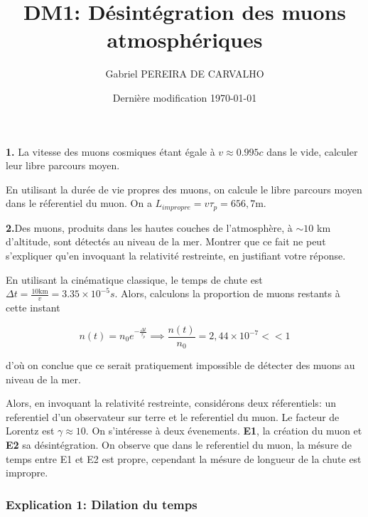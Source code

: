 \documentclass[french]{article}
\begin{document}
	\title{DM1: Désintégration des muons atmosphériques}
	\author{Gabriel PEREIRA DE CARVALHO}
	\date{Dernière modification \today}
	
	\maketitle
	
	\begin{tcolorbox}[colback=gray!5!white,colframe=gray!75!black]
		\textbf{1.} La vitesse des muons cosmiques étant égale à $v \approx 0.995c$ dans le vide, calculer leur libre parcours moyen. 
	\end{tcolorbox}

	En utilisant la durée de vie propres des muons, on calcule le libre parcours moyen dans le réferentiel du muon. On a $L_{impropre} = v \tau_p = 656,7 \mathrm{m}$.

	\begin{tcolorbox}[colback=gray!5!white,colframe=gray!75!black]
		\textbf{2.}Des muons, produits dans les hautes couches de l'atmosphère, à $\sim 10$ km d'altitude, sont détectés au niveau de la mer. Montrer que ce fait ne peut s'expliquer qu'en invoquant la relativité restreinte, en justifiant votre réponse.
	\end{tcolorbox}

	En utilisant la cinématique classique, le temps de chute est $\Delta t = \frac{10 \mathrm{km}}{v} = 3.35 \times 10^{-5}s$. Alors, calculons la proportion de muons restants à cette instant
	
	$$ n(t) = n_0 e^{-\frac{\Delta t}{\tau_p}} \implies \frac{n(t)}{n_0} = 2,44 \times 10^{-7} << 1 $$
	
	d'où on conclue que ce serait pratiquement impossible de détecter des muons au niveau de la mer.

	Alors, en invoquant la relativité restreinte, considérons deux réferentiels: un referentiel d'un observateur sur terre et le referentiel du muon. Le facteur de Lorentz est $\gamma \approx 10$. On s'intéresse à deux évenements. \textbf{E1}, la création du muon et \textbf{E2} sa désintégration. On observe que dans le referentiel du muon, la mésure de temps entre E1 et E2 est propre, cependant la mésure de longueur de la chute est impropre.

	\subsubsection*{Explication 1: Dilation du temps}
	
\end{document}
